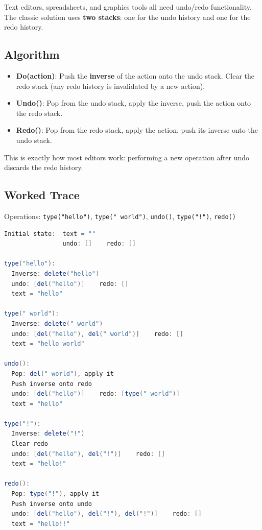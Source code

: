 Text editors, spreadsheets, and graphics tools all need undo/redo functionality. The classic solution uses \textbf{two stacks}: one for the undo history and one for the redo history.

\subsection{Algorithm}

\begin{itemize}
\item \textbf{Do(action)}: Push the \textbf{inverse} of the action onto the undo stack. Clear the redo stack (any redo history is invalidated by a new action).
\item \textbf{Undo()}: Pop from the undo stack, apply the inverse, push the action onto the redo stack.
\item \textbf{Redo()}: Pop from the redo stack, apply the action, push its inverse onto the undo stack.
\end{itemize}

This is exactly how most editors work: performing a new operation after undo discards the redo history.

\subsection{Worked Trace}

Operations: \texttt{type("hello")}, \texttt{type(" world")}, \texttt{undo()}, \texttt{type("!")}, \texttt{redo()}

\begin{lstlisting}[language=Java]
Initial state:  text = ""
                undo: []    redo: []

type("hello"):
  Inverse: delete("hello")
  undo: [del("hello")]    redo: []
  text = "hello"

type(" world"):
  Inverse: delete(" world")
  undo: [del("hello"), del(" world")]    redo: []
  text = "hello world"

undo():
  Pop: del(" world"), apply it
  Push inverse onto redo
  undo: [del("hello")]    redo: [type(" world")]
  text = "hello"

type("!"):
  Inverse: delete("!")
  Clear redo
  undo: [del("hello"), del("!")]    redo: []
  text = "hello!"

redo():
  Pop: type("!"), apply it
  Push inverse onto undo
  undo: [del("hello"), del("!"), del("!")]    redo: []
  text = "hello!!"
\end{lstlisting}

